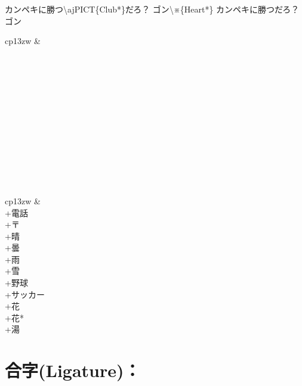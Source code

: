 \documentclass[uplatex, dvipdfmx, paper=a4paper, line_length=45zw, head_space=7zw, foot_space=10zw]{jlreq}
\begin{document}
\begin{demosource}
  カンペキに勝つ{\textbackslash}ajPICT\{Club*\}だろ？\<
  ゴン{\textbackslash}※\{Heart*\}
  \tcblower
  カンペキに勝つだろ？ゴン
\end{demosource}

\begin{center}
  \begin{booktabular}{cp{13zw}}
     &  \\
    \midrule
          \\
        \\
         \\
       \\
         \\
       \\
       \\
     \\
             \\
             \\
             \\
             \\
  \end{booktabular}
  \hfil
  \begin{booktabular}{cp{13zw}}
     &  \\
    \midrule
    \ajPS+{電話}     \\
    \ajPS+{〒}       \\
    \ajPS+{晴}       \\
    \ajPS+{曇}       \\
    \ajPS+{雨}       \\
    \ajPS+{雪}       \\
    \ajPS+{野球}     \\
    \ajPS+{サッカー} \\
    \ajPS+{花}       \\
    \ajPS*+{花*}     \\
    \ajPS+{湯}       \\
  \end{booktabular}
\end{center}

\section{合字(Ligature)：\texorpdfstring{}{\textbackslash ajLig}}
\end{document}
